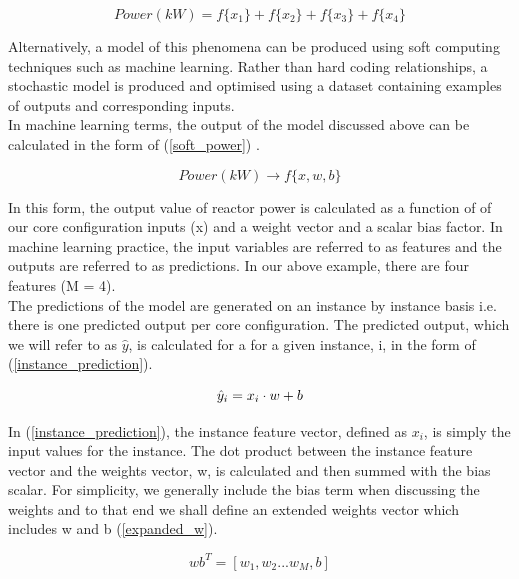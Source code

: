 \begin{equation} \label{linear_model}
	Power (kW) = f\{x_1\} + f\{x_2\} + f\{x_3\} + f\{x_4\} 
\end{equation}


\noindent
Alternatively, a model of this phenomena can be produced using soft computing techniques \cite{ibrahim2016overview} such as machine learning. Rather than hard coding relationships, a stochastic model is produced and optimised using a dataset containing examples of outputs and corresponding inputs. \\

\noindent
In machine learning terms, the output of the model discussed above can be calculated in the form of (\ref{soft_power}) .

\begin{equation} \label{soft_power}
	Power(kW)  \rightarrow f\{x, w, b\}
\end{equation}

\noindent
In this form, the output value of reactor power is calculated as a function of of our core configuration inputs (x) and a weight vector and a scalar bias factor. In machine learning practice, the input variables are referred to as features and the outputs are referred to as predictions. In our above example, there are four features (M = 4). \\

\noindent
The predictions of the model are generated on an instance by instance basis i.e. there is one predicted output per core configuration. The predicted output, which we will refer to as $\hat{y}$, is calculated for a for a given instance, i, in the form of (\ref{instance_prediction}).

\begin{equation} \label{instance_prediction}
	\hat{y}_i = x_i \space \cdot \space w + b
\end{equation}

\noindent 
In (\ref{instance_prediction}), the instance feature vector, defined as $x_i$, is simply the input values for the instance. The dot product between the instance feature vector and the weights vector, w, is calculated and then summed with the bias scalar.  For simplicity, we generally include the bias term when discussing the weights and to that end we shall define an extended weights vector which includes w and b (\ref{expanded_w}).

\begin{equation} \label{expanded_w}
	wb^T = [w_1, w_2 ... w_M, b]
\end{equation}

